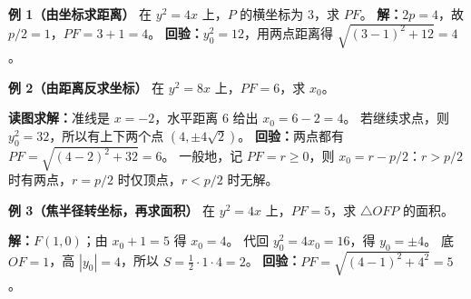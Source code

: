 \clearpage
\begin{examplebox}
\textbf{\textcolor{CExample}{例 1（由坐标求距离）}}
在 $y^2=4x$ 上，$P$ 的横坐标为 $3$，求 $PF$。
\textbf{解：}$2p=4$，故 $p/2=1$，$PF=3+1=\boxed{4}$。
\textbf{回验：}$y_0^2=12$，用两点距离得 $\sqrt{(3-1)^2+12}=4$。

\medskip
\textbf{\textcolor{CExample}{例 2（由距离反求坐标）}}
在 $y^2=8x$ 上，$PF=6$，求 $x_0$。
\begin{center}\end{center}
\textbf{读图求解：}准线是 $x=-2$，水平距离 $6$ 给出 $x_0=6-2=\boxed{4}$。
若继续求点，则 $y_0^2=32$，所以有上下两个点 $(4,\pm4\sqrt2)$。
\textbf{回验：}两点都有 $PF=\sqrt{(4-2)^2+32}=6$。
一般地，记 $PF=r\ge0$，则 $x_0=r-p/2$：$r>p/2$ 时有两点，$r=p/2$ 时仅顶点，$r<p/2$ 时无解。
\end{examplebox}
\clearpage
\begin{examplebox}
\medskip
\textbf{\textcolor{CExample}{例 3（焦半径转坐标，再求面积）}}
在 $y^2=4x$ 上，$PF=5$，求 $\triangle OFP$ 的面积。
\begin{center}\end{center}
\textbf{解：}$F(1,0)$；由 $x_0+1=5$ 得 $x_0=4$。
代回 $y_0^2=4x_0=16$，得 $y_0=\pm4$。
底 $OF=1$，高 $|y_0|=4$，所以 $S=\frac12\cdot1\cdot4=\boxed{2}$。
\textbf{回验：}$PF=\sqrt{(4-1)^2+4^2}=5$。
\end{examplebox}
\clearpage
